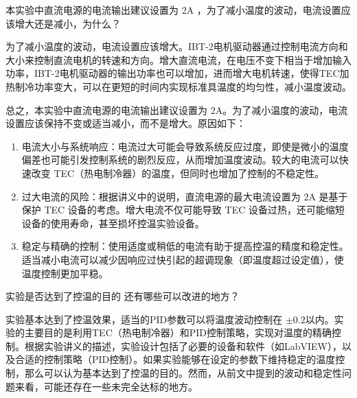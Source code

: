 \documentclass[dvipsnames, svgnames,a4paper,11pt]{article}
\begin{document}
	
	\begin{question}
		本实验中直流电源的电流输出建议设置为 2A ，为了减小温度的波动，电流设置应该增大还是减小，为什么？
	\end{question}
	为了减小温度的波动，电流设置应该增大。IBT-2电机驱动器通过控制电流方向和大小来控制直流电机的转速和方向。增大直流电流，在电压不变下相当于增加输入功率，IBT-2电机驱动器的输出功率也可以增加，进而增大电机转速，使得TEC加热制冷功率变大，可以在更短的时间内实现标准具温度的均匀性，减小温度波动。
	
	总之，本实验中直流电源的电流输出建议设置为 2A。为了减小温度的波动，电流设置应该保持不变或适当减小，而不是增大。原因如下：
	\begin{enumerate}
		\item 电流大小与系统响应：电流过大可能会导致系统反应过度，即使是微小的温度偏差也可能引发控制系统的剧烈反应，从而增加温度波动。较大的电流可以快速改变 TEC（热电制冷器）的温度，但同时也增加了控制的不稳定性。
		\item 过大电流的风险：根据讲义中的说明，直流电源的最大电流设置为 2A 是基于保护 TEC 设备的考虑。增大电流不仅可能导致 TEC 设备过热，还可能缩短设备的使用寿命，甚至损坏控温实验设备。
		\item 稳定与精确的控制：使用适度或稍低的电流有助于提高控温的精度和稳定性。适当减小电流可以减少因响应过快引起的超调现象（即温度超过设定值），使温度控制更加平稳。
	\end{enumerate}
	
	
	\begin{question}
		实验是否达到了控温的目的 还有哪些可以改进的地方？
	\end{question}
	实验基本达到了控温效果，适当的PID参数可以将温度波动控制在 $\pm 0.2$\degree 以内。实验的主要目的是利用TEC（热电制冷器）和PID控制策略，实现对温度的精确控制。根据实验讲义的描述，实验设计包括了必要的设备和软件（如LabVIEW），以及合适的控制策略（PID控制）。如果实验能够在设定的参数下维持稳定的温度控制，那么可以认为基本达到了控温的目的。然而，从前文中提到的波动和稳定性问题来看，可能还存在一些未完全达标的地方。
	
\end{document}
